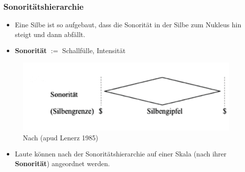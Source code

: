 \begin{frame}
\frametitle{Sonoritätshierarchie}

\begin{itemize}
	\item Eine Silbe ist so aufgebaut, dass die Sonorität in der Silbe zum Nukleus hin steigt und dann abfällt.

	\item \textbf{Sonorität} $:=$ Schallfülle, Intensität

\end{itemize}

\begin{figure}
\centering
\includegraphics[scale=.2]{material/03bSonoritaetRamers}
\caption{Nach \citet[93]{Ramers08a} (apud Lenerz 1985)}
\end{figure}

\begin{itemize}
	\item Laute können nach der Sonoritätshierarchie auf einer Skala (nach ihrer \textbf{Sonorität}) angeordnet werden.
\end{itemize}

\end{frame}





